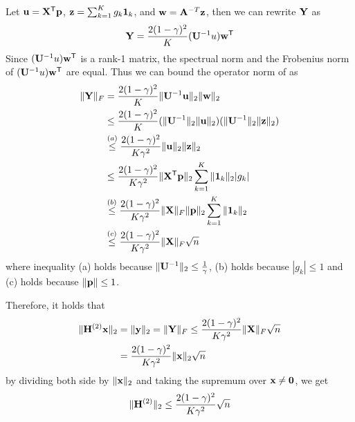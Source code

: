 Let $\mathbf{{u}} = \mathbf{{X}}^{\mathsf{T}} \mathbf{{p}}$, $\mathbf{{z}} = \sum_{k=1}^{K} g_k \mathbf{{1}}_{k}$, and $\mathbf{{w}} = \mathbf{{A}}^{-T} \mathbf{{z}}$, then we can rewrite $\mathbf{{Y}}$ as
\begin{equation*}
	\mathbf{{Y}} = \frac{2(1-\gamma)^2}{K} (\mathbf{{U}}^{-1} u) \mathbf{{w}}^{\mathsf{T}}
\end{equation*}
Since  $(\mathbf{{U}}^{-1} u) \mathbf{{w}}^{\mathsf{T}}$ is a rank-1 matrix, the spectrual norm and the Frobenius norm of $(\mathbf{{U}}^{-1} u) \mathbf{{w}}^{\mathsf{T}}$ are equal. 
Thus we can bound the operator norm of \Ymatrix as
\begin{align*}
	\|\mathbf{{Y}}\|_F & = \frac{2(1-\gamma)^2}{K} \|\mathbf{{U}}^{-1} \mathbf{{u}}\|_2   \|\mathbf{{w}}\|_2 \\
	&\leq \frac{2(1-\gamma)^2}{K} (\|\mathbf{{U}}^{-1}\|_2  \|\mathbf{{u}}\|_2)  (\|\mathbf{{U}}^{-1}\|_2 \|\mathbf{{z}}\|_2)\\
	&\stackrel{(a)}{\leq} \frac{2(1-\gamma)^2}{K \gamma^2} \|\mathbf{{u}}\|_2 \|\mathbf{{z}}\|_2\\
	& \leq \frac{2(1-\gamma)^2}{K \gamma^2} \|\mathbf{{X}}^{\mathsf{T}} \mathbf{{p}}\|_2 \sum_{k=1}^{K} \|\mathbf{{1}}_{k}\|_2 |g_k| \\
	& \stackrel{(b)}{\leq}\frac{2(1-\gamma)^2}{K \gamma^2} \|\mathbf{{X}}\|_F \|\mathbf{{p}}\|_2 \sum_{k=1}^{K} \|\mathbf{{1}}_{k}\|_2 \\
		& \stackrel{(c)}{\leq}\frac{2(1-\gamma)^2}{K \gamma^2} \|\mathbf{{X}}\|_F  \sqrt{n} 
\end{align*}
where inequality (a) holds because $\|\mathbf{{U}}^{-1}\|_2 \leq \frac{1}{\gamma}$, (b) holds because $|g_k| \leq 1$ and (c) holds because $\|\mathbf{{p}}\| \leq 1$.

Therefore, it holds that
\begin{align*}
 \|\mathbf{{H}}^{(2)} \mathbf{{x}} \|_2 &= 	 \| \mathbf{{y}} \|_2 = \|\mathbf{{Y}}\|_F \leq \frac{2(1-\gamma)^2}{K \gamma^2} \|\mathbf{{X}}\|_F  \sqrt{n} \\
 &= \frac{2(1-\gamma)^2}{K \gamma^2} \| \mathbf{{x}}\|_2  \sqrt{n}
\end{align*}
by dividing both side by $\|\mathbf{{x}}\|_2$ and taking the supremum over $\mathbf{{x}} \neq \mathbf{{0}}$, we get
	\begin{equation}
		\label{eq:boundh2}
		\|\mathbf{{H}}^{(2)}\|_2 \leq \frac{2(1-\gamma)^2}{K \gamma^2} \sqrt{n} 
	\end{equation}


